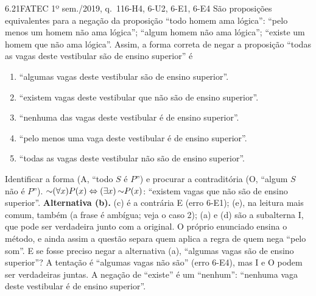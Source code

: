\begin{exemplo}{6.2}{1}{FATEC 1º sem./2019, q.~11}{6-H4, 6-U2, 6-E1, 6-E4}\label{ex:6.2}
São proposições equivalentes para a negação da proposição \enquote{todo homem ama lógica}: \enquote{pelo menos um homem não ama lógica}; \enquote{algum homem não ama lógica}; \enquote{existe um homem que não ama lógica}. Assim, a forma correta de negar a proposição \enquote{todas as vagas deste vestibular são de ensino superior} é
\begin{enumerate}[label=(\alph*)]
  \item \enquote{algumas vagas deste vestibular são de ensino superior}.
  \item \enquote{existem vagas deste vestibular que não são de ensino superior}.
  \item \enquote{nenhuma das vagas deste vestibular é de ensino superior}.
  \item \enquote{pelo menos uma vaga deste vestibular é de ensino superior}.
  \item \enquote{todas as vagas deste vestibular não são de ensino superior}.
\end{enumerate}
\plano Identificar a forma (A, \enquote{todo $S$ é $P$}) e procurar a contraditória (O, \enquote{algum $S$ não é $P$}).
\resolucao
${{\sim}}(\forall x)P(x)\Leftrightarrow(\exists x)\,{{\sim}}P(x)$: \enquote{existem vagas que não são de ensino superior}. \textbf{Alternativa (b).}
\comentario (c) é a contrária E (erro 6-E1); (e), na leitura mais comum, também (a frase é ambígua; veja o caso 2); (a) e (d) são a subalterna I, que pode ser verdadeira junto com a original. O próprio enunciado ensina o método, e ainda assim a questão separa quem aplica a regra de quem nega \enquote{pelo som}. E se fosse preciso negar a alternativa (a), \enquote{algumas vagas são de ensino superior}? A tentação é \enquote{algumas vagas não são} (erro 6-E4), mas I e O podem ser verdadeiras juntas. A negação de \enquote{existe} é um \enquote{nenhum}: \enquote{nenhuma vaga deste vestibular é de ensino superior}.
\end{exemplo}

